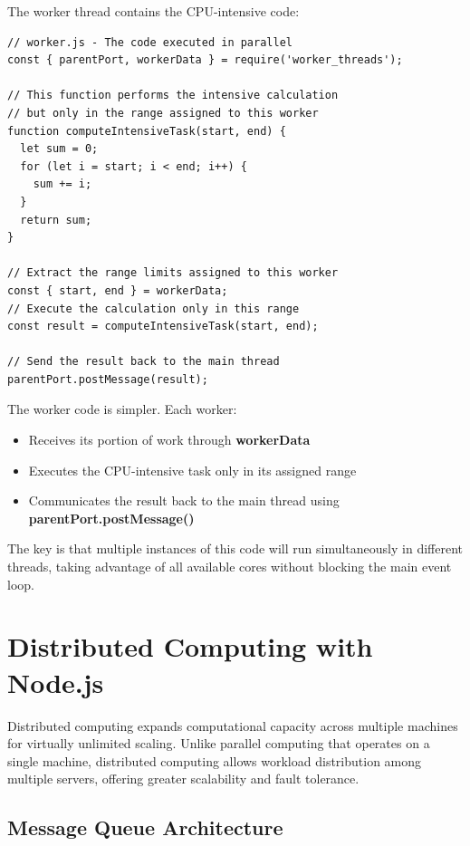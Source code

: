 The worker thread contains the CPU-intensive code:

\begin{macterminal}
\begin{lstlisting}
// worker.js - The code executed in parallel
const { parentPort, workerData } = require('worker_threads');

// This function performs the intensive calculation
// but only in the range assigned to this worker
function computeIntensiveTask(start, end) {
  let sum = 0;
  for (let i = start; i < end; i++) {
    sum += i;
  }
  return sum;
}

// Extract the range limits assigned to this worker
const { start, end } = workerData;
// Execute the calculation only in this range
const result = computeIntensiveTask(start, end);

// Send the result back to the main thread
parentPort.postMessage(result);
\end{lstlisting}
\end{macterminal}

The worker code is simpler. Each worker:
\begin{itemize}
    \item Receives its portion of work through \textbf{\textcolor{accentColor}{workerData}}
    \item Executes the CPU-intensive task only in its assigned range
    \item Communicates the result back to the main thread using \textbf{\textcolor{accentColor}{parentPort.postMessage()}}
\end{itemize}

The key is that multiple instances of this code will run simultaneously in different threads, taking advantage of all available cores without blocking the main event loop.

\section{Distributed Computing with Node.js}

Distributed computing expands computational capacity across multiple machines for virtually unlimited scaling. Unlike parallel computing that operates on a single machine, distributed computing allows workload distribution among multiple servers, offering greater scalability and fault tolerance.

\subsection{Message Queue Architecture}

